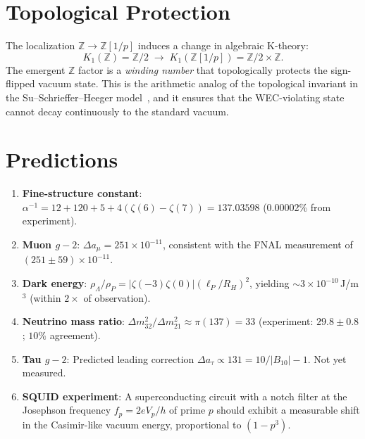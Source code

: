 \documentclass[aps,prl,twocolumn,superscriptaddress,nofootinbib]{revtex4-2}
\begin{document}
\section{Topological Protection}

The localization $\mathbb{Z}\to\mathbb{Z}[1/p]$ induces a change
in algebraic K-theory:
\begin{equation}
  K_1(\mathbb{Z})=\mathbb{Z}/2 \;\longrightarrow\;
  K_1(\mathbb{Z}[1/p])=\mathbb{Z}/2\times\mathbb{Z}.
\end{equation}
The emergent $\mathbb{Z}$ factor is a \emph{winding number} that
topologically protects the sign-flipped vacuum state.  This is the
arithmetic analog of the topological invariant in the
Su--Schrieffer--Heeger model~\cite{SSH1979}, and it ensures that
the WEC-violating state cannot decay continuously to the standard
vacuum.

\section{Predictions}

\begin{enumerate}
\item \textbf{Fine-structure constant}:
$\alpha^{-1}=12+120+5+4(\zeta(6)-\zeta(7))=137.03598$
(0.00002\% from experiment).

\item \textbf{Muon $g{-}2$}: $\Delta a_\mu=251\times 10^{-11}$,
consistent with the FNAL measurement of $(251\pm 59)\times 10^{-11}$.

\item \textbf{Dark energy}: $\rho_\Lambda/\rho_P=|\zeta(-3)\zeta(0)|
(\ell_P/R_H)^2$, yielding $\sim 3\times 10^{-10}$\,J/m$^3$
(within $2\times$ of observation).

\item \textbf{Neutrino mass ratio}:
$\Delta m^2_{32}/\Delta m^2_{21}\approx\pi(137)=33$
(experiment: $29.8\pm 0.8$; $10\%$ agreement).

\item \textbf{Tau $g{-}2$}: Predicted leading correction
$\Delta a_\tau\propto 131=10/|B_{10}|-1$. Not yet measured.

\item \textbf{SQUID experiment}: A superconducting circuit with a
notch filter at the Josephson frequency $f_p=2eV_p/h$ of prime $p$
should exhibit a measurable shift in the Casimir-like vacuum energy,
proportional to $(1-p^3)$.
\end{enumerate}
\end{document}
